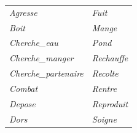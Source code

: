 \documentclass[french]{report}
\newlength{\du}\fi
\begin{document}
	\begin{center}
		\begin{tabular}{ll}
			\textit{Agresse} &\textit{Fuit}\\ 
			\textit{Boit}&\textit{Mange}\\ 
			\textit{Cherche\_eau}&\textit{Pond}\\ 
			\textit{Cherche\_manger}&\textit{Rechauffe}\\ 
			\textit{Cherche\_partenaire}&\textit{Recolte}\\ 
			\textit{Combat}&\textit{Rentre}\\ 
			\textit{Depose}&\textit{Reproduit}\\ 
			\textit{Dors}&\textit{Soigne}\\ 
		\end{tabular}\\


\end{center}
\end{document}
